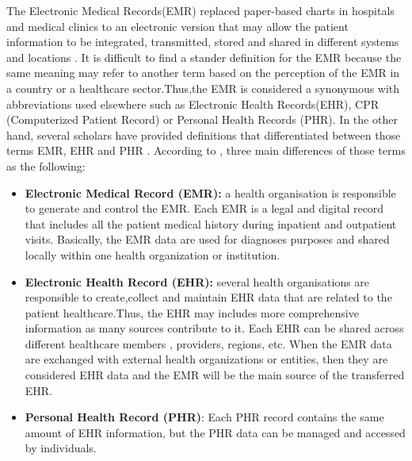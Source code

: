 The  Electronic Medical Records(EMR) replaced paper-based charts in hospitals and medical clinics to an electronic version that may allow the patient information to be integrated, transmitted, stored and shared in different systems and locations \cite{Rahim2016}. It is difficult to find a stander definition for the EMR because the same meaning may refer to another term based on the perception of the EMR in a country or a healthcare sector.Thus,the EMR is considered a synonymous with abbreviations used elsewhere such as  Electronic Health Records(EHR)\cite{WorldHealthOrganization2016,Rahim2016,}, CPR (Computerized Patient Record) or Personal Health Records (PHR). In the other hand, several scholars have provided definitions that differentiated between those terms EMR, EHR and PHR \cite{Kierkegaard2011,Deutsch2010} . According to \cite{Yang2015,U.S.DepartmentofHealthandHumanServices2015}, three main differences of those terms  as the following:
\begin{itemize}
	\item\textbf{ Electronic Medical Record (EMR):} a health organisation is responsible to generate and control the EMR. Each EMR is a legal and digital record that includes all the patient medical history  during inpatient and outpatient visits. Basically, the EMR data are used for diagnoses purposes and shared locally within one health organization or institution\cite{Yang2015}. 
	\item \textbf{Electronic Health Record (EHR):} several health organisations are responsible to create,collect and maintain EHR data that are related to the patient healthcare.Thus, the EHR  may includes more comprehensive information as many sources contribute to it. Each EHR can be shared across different healthcare members , providers, regions, etc. When the EMR data are exchanged with external health organizations or entities, then they are considered EHR data and the EMR will be the main source of the transferred EHR\cite{Yang2015}.  
	\item \textbf{Personal Health Record (PHR)}: Each PHR record contains the same amount of EHR information, but the PHR data can be managed and accessed by individuals\cite{Yang2015,U.S.DepartmentofHealthandHumanServices2015}.
\end{itemize}


